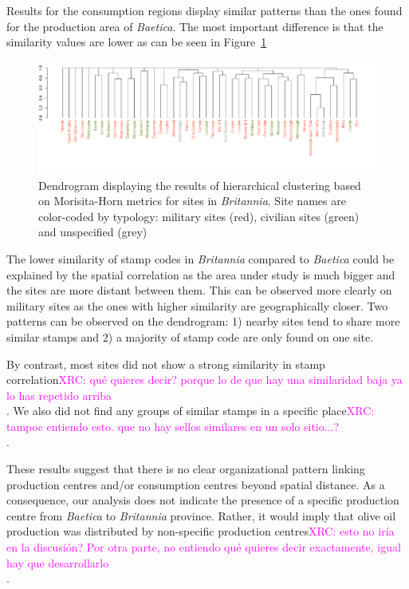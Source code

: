 \documentclass[review]{elsarticle}
\newcommand{\memo}[2]{\textcolor{#1}{#2}}
\newcommand{\xavi}[1]{\memo{magenta}{XRC: #1\\}}
\begin{document}
Results for the consumption regions display similar patterns than the ones found for the production area of \textit{Baetica}. The most important difference is that the similarity values are lower as can be seen in Figure~\ref{britmap}


\begin{figure}
	\centering
\includegraphics[angle=180,width=\linewidth]{figs/dendrobrit5.pdf}
\caption{Dendrogram displaying the results of hierarchical clustering based on Morisita-Horn metrics for sites in \textit{Britannia}. Site names are color-coded by typology: military sites (red), civilian sites (green) and unspecified (grey)}
\label{britmap}
\end{figure}

The lower similarity of stamp codes in \textit{Britannia} compared to \textit{Baetica} could be explained by the spatial correlation as the area under study is much bigger and the sites are more distant between them. This can be observed more clearly on military sites as the ones with higher similarity are geographically closer. Two patterns can be observed on the dendrogram: 1) nearby sites tend to share more similar stamps and 2) a majority of stamp code are only found on one site.

By contrast, most sites did not show a strong similarity in stamp correlation\xavi{qué quieres decir? porque lo de que hay una similaridad baja ya lo has repetido arriba}. We also did not find any groups of similar stamps in a specific place\xavi{tampoc entiendo esto. que no hay sellos similares en un solo sitio...?}.
    
These results suggest that there is no clear organizational pattern linking production centres and/or consumption centres beyond spatial distance. As a consequence, our analysis does not indicate the presence of a specific production centre from \textit{Baetica} to \textit{Britannia} province. Rather, it would imply that olive oil production was distributed by non-specific production centres\xavi{esto no iría en la discusión? Por otra parte, no entiendo qué quieres decir exactamente, igual hay que desarrollarlo}. 
\end{document}
